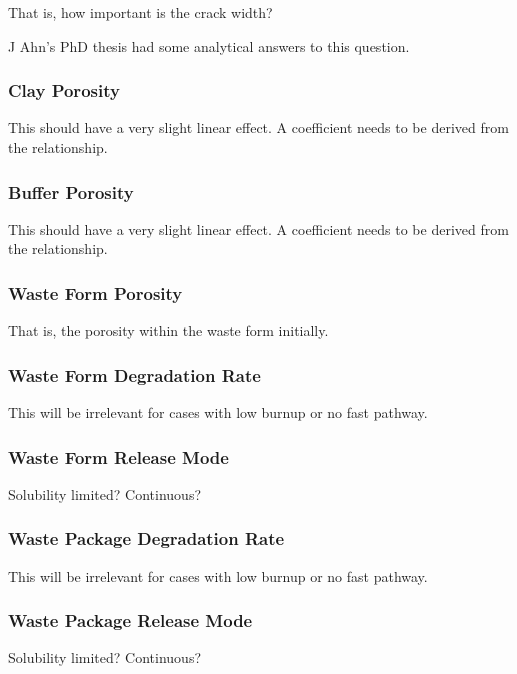 That is, how important is the crack width?

J Ahn's PhD  thesis had some analytical answers to this question.

\subsubsection{Clay Porosity}

This should have a very slight linear effect. A coefficient needs to be derived 
from the relationship.

\subsubsection{Buffer Porosity}

This should have a very slight linear effect. A coefficient needs to be derived 
from the relationship.

\subsubsection{Waste Form Porosity}

That is, the porosity within the waste form initially.

\subsubsection{Waste Form Degradation Rate}

This will be irrelevant for cases with low burnup or no fast pathway. 

\subsubsection{Waste Form Release Mode}

Solubility limited? Continuous?

\subsubsection{Waste Package Degradation Rate}

This will be irrelevant for cases with low burnup or no fast pathway. 

\subsubsection{Waste Package Release Mode}

Solubility limited? Continuous?


